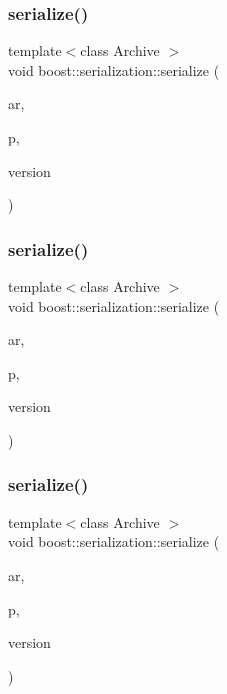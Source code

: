 \subsubsection{\texorpdfstring{serialize()}{serialize()}\hspace{0.1cm}{\footnotesize\ttfamily [2/6]}}
{\footnotesize\ttfamily template$<$class Archive $>$ \\
void boost\+::serialization\+::serialize (\begin{DoxyParamCaption}\item[{Archive \&}]{ar,  }\item[{N\+T\+L\+::\+Z\+Z\+\_\+p \&}]{p,  }\item[{const unsigned int}]{version }\end{DoxyParamCaption})}

\mbox{\label{namespaceboost_1_1serialization_a0734cf2ae9e8ce324e5d26bdea7afd70}} 
\subsubsection{\texorpdfstring{serialize()}{serialize()}\hspace{0.1cm}{\footnotesize\ttfamily [3/6]}}
{\footnotesize\ttfamily template$<$class Archive $>$ \\
void boost\+::serialization\+::serialize (\begin{DoxyParamCaption}\item[{Archive \&}]{ar,  }\item[{N\+T\+L\+::\+Z\+ZX \&}]{p,  }\item[{const unsigned int}]{version }\end{DoxyParamCaption})}

\mbox{\label{namespaceboost_1_1serialization_aeb170b7c609eb6350c2bcf3331d6f140}} 
\subsubsection{\texorpdfstring{serialize()}{serialize()}\hspace{0.1cm}{\footnotesize\ttfamily [4/6]}}
{\footnotesize\ttfamily template$<$class Archive $>$ \\
void boost\+::serialization\+::serialize (\begin{DoxyParamCaption}\item[{Archive \&}]{ar,  }\item[{N\+T\+L\+::vec\+\_\+\+ZZ \&}]{p,  }\item[{const unsigned int}]{version }\end{DoxyParamCaption})}

